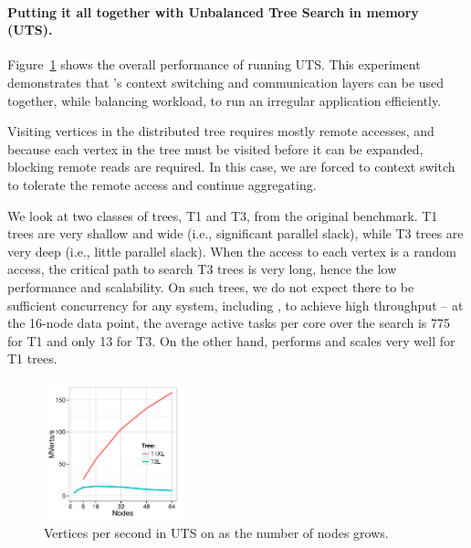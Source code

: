 
\paragraph{Putting it all together with Unbalanced Tree Search in memory
(UTS).} 
Figure~\ref{fig:grappa-uts} shows the overall performance of \Grappa running
UTS. This experiment demonstrates that \Grappa's context
switching and communication layers can be used together, while
balancing workload, to run an irregular application efficiently. 

Visiting vertices in the distributed tree requires mostly remote
accesses, and because each vertex in the tree must be visited before
it can be expanded, blocking remote reads are required. In this case,
we are forced to context switch to tolerate the remote access and
continue aggregating.

We look at two classes of trees, T1 and T3, from
the original benchmark. T1 trees are very shallow and wide (i.e., significant
parallel slack), while T3 trees are very deep (i.e., little parallel slack).
When the access to each vertex is a random access, the critical path to search
T3 trees is very long, hence the low performance and scalability. On such
trees, we do not expect there to be sufficient concurrency for any system,
including \Grappa, to achieve high throughput -- at the 16-node data point,
the average active tasks per core over the search is 775 for T1 and
only 13 for T3.
On the other hand, \Grappa performs and scales very well for T1
trees.


\begin{figure}[ht]
    \begin{center}
      \includegraphics[width=0.36\textwidth]{results/plot_scaling_uts.pdf}
    \end{center}
    \caption{Vertices per second in UTS on \Grappa as the number of nodes grows.}
    \label{fig:grappa-uts}
\end{figure}

